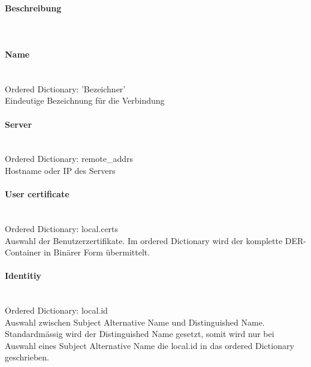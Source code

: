\hfill
\begin{minipage}[t]{0.5\textwidth}
\vspace{0pt}
\paragraph{Beschreibung}\mbox{}\\
\paragraph{Name}\label{name}\mbox{}\\
\hspace*{18pt}Ordered Dictionary: 'Bezeichner'\\
Eindeutige Bezeichnung für die Verbindung \\

\paragraph{Server}\label{server}\mbox{}\\
\hspace*{18pt}Ordered Dictionary: remote\_addrs\\
Hostname oder IP des Servers\\

\paragraph{User certificate}\label{usercertificate}\mbox{}\\
\hspace*{18pt}Ordered Dictionary: local.certs\\
Auswahl der Benutzerzertifikate. Im ordered Dictionary wird der komplette DER-Container in Binärer Form übermittelt.\\

\paragraph{Identitiy}\label{identitiy}\mbox{}\\
\hspace*{18pt}Ordered Dictionary: local.id\\
Auswahl zwischen Subject Alternative Name und Distinguished Name. Standardmässig wird der Distinguished Name gesetzt, somit wird nur bei Auswahl eines Subject Alternative Name die local.id in das ordered Dictionary geschrieben.\\


\end{minipage}
